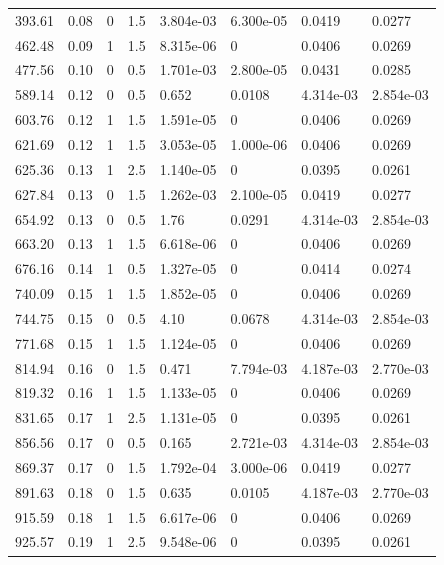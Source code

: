 \documentclass[preview]{standalone}
\begin{document}
{{\begin{tabular}{L{1.2cm}C{1.2cm} C{0.3cm}C{0.5cm} C{1.4cm}C{1.4cm} C{1.4cm}C{1.4cm}}
  393.61  &  0.08  & 0     & 1.5 &  3.804e-03  & 6.300e-05  & 0.0419 &  0.0277   \\ 
  462.48  &  0.09  & 1     & 1.5 &  8.315e-06  & 0  & 0.0406 &  0.0269   \\ 
  477.56  &  0.10  & 0     & 0.5 &  1.701e-03  & 2.800e-05  & 0.0431 &  0.0285   \\ 
  589.14  &  0.12  & 0     & 0.5 &  0.652  & 0.0108  & 4.314e-03 &  2.854e-03   \\ 
  603.76  &  0.12  & 1     & 1.5 &  1.591e-05  & 0  & 0.0406 &  0.0269   \\ 
  621.69  &  0.12  & 1     & 1.5 &  3.053e-05  & 1.000e-06  & 0.0406 &  0.0269   \\ 
  625.36  &  0.13  & 1     & 2.5 &  1.140e-05  & 0  & 0.0395 &  0.0261   \\ 
  627.84  &  0.13  & 0     & 1.5 &  1.262e-03  & 2.100e-05  & 0.0419 &  0.0277   \\ 
  654.92  &  0.13  & 0     & 0.5 &  1.76  & 0.0291  & 4.314e-03 &  2.854e-03   \\ 
  663.20  &  0.13  & 1     & 1.5 &  6.618e-06  & 0  & 0.0406 &  0.0269   \\ 
  676.16  &  0.14  & 1     & 0.5 &  1.327e-05  & 0  & 0.0414 &  0.0274   \\ 
  740.09  &  0.15  & 1     & 1.5 &  1.852e-05  & 0  & 0.0406 &  0.0269   \\ 
  744.75  &  0.15  & 0     & 0.5 &  4.10  & 0.0678  & 4.314e-03 &  2.854e-03   \\ 
  771.68  &  0.15  & 1     & 1.5 &  1.124e-05  & 0  & 0.0406 &  0.0269   \\ 
  814.94  &  0.16  & 0     & 1.5 &  0.471  & 7.794e-03  & 4.187e-03 &  2.770e-03   \\ 
  819.32  &  0.16  & 1     & 1.5 &  1.133e-05  & 0  & 0.0406 &  0.0269   \\ 
  831.65  &  0.17  & 1     & 2.5 &  1.131e-05  & 0  & 0.0395 &  0.0261   \\ 
  856.56  &  0.17  & 0     & 0.5 &  0.165  & 2.721e-03  & 4.314e-03 &  2.854e-03   \\ 
  869.37  &  0.17  & 0     & 1.5 &  1.792e-04  & 3.000e-06  & 0.0419 &  0.0277   \\ 
  891.63  &  0.18  & 0     & 1.5 &  0.635  & 0.0105  & 4.187e-03 &  2.770e-03   \\ 
  915.59  &  0.18  & 1     & 1.5 &  6.617e-06  & 0  & 0.0406 &  0.0269   \\ 
  925.57  &  0.19  & 1     & 2.5 &  9.548e-06  & 0  & 0.0395 &  0.0261   \\ 

\end{tabular}}}
\end{document}
